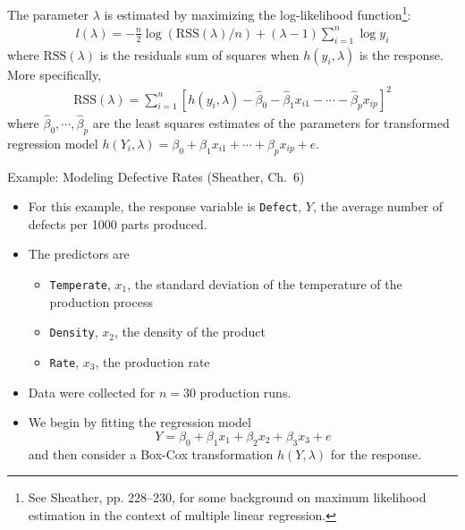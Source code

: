 \documentclass[10pt]{beamer}\usepackage[]{graphicx}\usepackage[]{color}
\newcommand{\RSS}{\text{RSS}}
\begin{document}
\begin{frame}
The parameter $\lambda$ is estimated by maximizing the log-likelihood function\footnote{See Sheather, pp. 228--230, for some background on maximum likelihood estimation in the context of multiple linear regression.}:
\begin{align*}
l(\lambda) = -\frac{n}{2} \log(\RSS(\lambda) / n) + (\lambda - 1) \sum_{i=1}^n \log y_i
\end{align*}
where $\RSS(\lambda)$ is the residuals sum of squares when $h(y_i, \lambda)$ is the response.  More specifically,
\begin{align*}
\RSS(\lambda) = \sum_{i=1}^n [h(y_i, \lambda) - \hat{\beta}_0 - \hat{\beta}_1 x_{i1} - \cdots - \hat{\beta}_p x_{ip}]^2
\end{align*}
where $\hat{\beta}_0, \cdots, \hat{\beta}_p$ are the least squares estimates of the parameters for transformed regression model $h(Y_i, \lambda)  = \beta_0 + \beta_1 x_{i1} + \cdots + \beta_p x_{ip} + e$.\\
\vspace{10pt}

\end{frame}

\begin{frame}{Example: Modeling Defective Rates (Sheather, Ch.~6)}
\begin{itemize}
\item For this example, the response variable is \texttt{Defect}, $Y$, the average number of defects per 1000 parts produced. 
\item The predictors are 
\begin{itemize}
\item \texttt{Temperate}, $x_1$, the standard deviation of the temperature of the production process
\item \texttt{Density}, $x_2$, the density of the product
\item \texttt{Rate}, $x_3$, the production rate
\end{itemize}
\item Data were collected for $n=30$ production runs. 
\item We begin by fitting the regression model 
$$Y = \beta_0 + \beta_1 x_1 + \beta_2 x_2 + \beta_3 x_3 + e$$
and then consider a Box-Cox transformation $h(Y, \lambda)$ for the response.
\end{itemize}
\end{frame}
\end{document}
